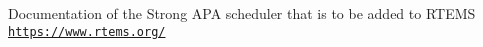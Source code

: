 Documentation of the Strong A\+PA scheduler that is to be added to R\+T\+E\+MS \href{https://www.rtems.org/}{\tt https\+://www.\+rtems.\+org/} 